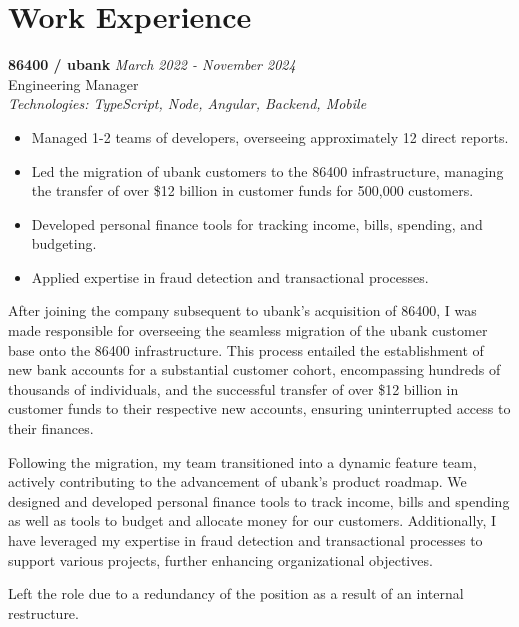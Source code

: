 \documentclass[a4paper,10pt]{article}
\begin{document}
\section*{Work Experience}

\textbf{86400 / ubank} \hfill \textit{March 2022 - November 2024} \\
Engineering Manager \\
\textit{Technologies: TypeScript, Node, Angular, Backend, Mobile}
\begin{itemize}
    \item Managed 1-2 teams of developers, overseeing approximately 12 direct reports.
    \item Led the migration of ubank customers to the 86400 infrastructure, managing the transfer of over \$12 billion in customer funds for 500,000 customers.
    \item Developed personal finance tools for tracking income, bills, spending, and budgeting.
    \item Applied expertise in fraud detection and transactional processes.
\end{itemize}

After joining the company subsequent to ubank's acquisition of 86400, I was made responsible for overseeing the seamless migration of the ubank customer base onto the 86400 infrastructure. This process entailed the establishment of new bank accounts for a substantial customer cohort, encompassing hundreds of thousands of individuals, and the successful transfer of over \$12 billion in customer funds to their respective new accounts, ensuring uninterrupted access to their finances.

Following the migration, my team transitioned into a dynamic feature team, actively contributing to the advancement of ubank's product roadmap. We designed and developed personal finance tools to track income, bills and spending as well as tools to budget and allocate money for our customers. Additionally, I have leveraged my expertise in fraud detection and transactional processes to support various projects, further enhancing organizational objectives.

Left the role due to a redundancy of the position as a result of an internal restructure.

\vspace{1em}
\end{document}
